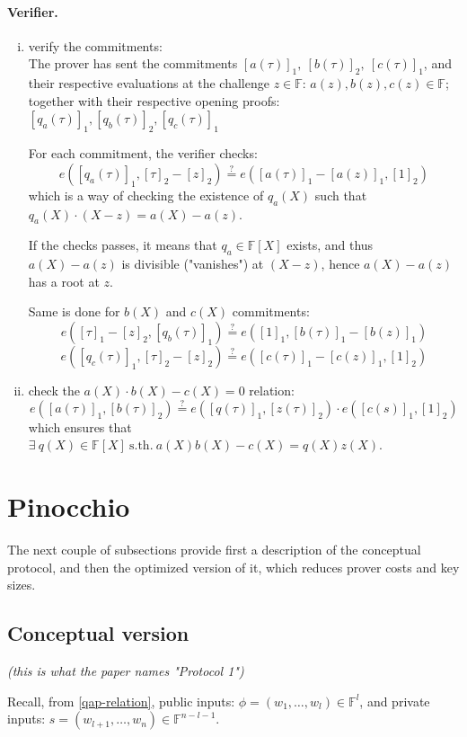 \documentclass{article}
\begin{document}
\paragraph{Verifier.}
\begin{enumerate}[i.]
    \item verify the commitments:\\
	The prover has sent the commitments $[a(\tau)]_1,~ [b(\tau)]_2,~ [c(\tau)]_1$, and their respective evaluations at the challenge $z \in \mathbb{F}$: $a(z), b(z), c(z) \in \mathbb{F}$; together with their respective opening proofs: $[q_a(\tau)]_1, [q_b(\tau)]_2, [q_c(\tau)]_1$

	For each commitment, the verifier checks:
	$$e([q_a(\tau)]_1, [\tau]_2 - [z]_2) \stackrel{?}{=} e([a(\tau)]_1 - [a(z)]_1, [1]_2)$$
	which is a way of checking the existence of $q_a(X)$ such that $q_a(X) \cdot (X-z) = a(X) - a(z)$.

	If the checks passes, it means that $q_a \in \mathbb{F}[X]$ exists, and thus $a(X) - a(z)$ is divisible ("vanishes") at $(X-z)$, hence $a(X) - a(z)$ has a root at $z$.

	Same is done for $b(X)$ and $c(X)$ commitments:
	$$e([\tau]_1 - [z]_2, [q_b(\tau)]_1) \stackrel{?}{=} e([1]_1, [b(\tau)]_1 - [b(z)]_1)$$
	$$e([q_c(\tau)]_1, [\tau]_2 - [z]_2) \stackrel{?}{=} e([c(\tau)]_1 - [c(z)]_1, [1]_2)$$

    \item check the $a(X) \cdot b(X) - c(X) = 0$ relation:
	$$e([a(\tau)]_1, [b(\tau)]_2) \stackrel{?}{=} e([q(\tau)]_1, [z(\tau)]_2) \cdot e([c(s)]_1, [1]_2)$$
	which ensures that $\exists~ q(X) \in \mathbb{F}[X] ~\text{s.th.}~ a(X) b(X) - c(X) = q(X) z(X)$.
\end{enumerate}

\section{Pinocchio}

The next couple of subsections provide first a description of the conceptual protocol, and then the optimized version of it, which reduces prover costs and key sizes.

\subsection{Conceptual version}
\emph{(this is what the paper names "Protocol 1")}

Recall, from \ref{qap-relation}, 
public inputs: $\phi = (w_1, \ldots, w_l) \in \mathbb{F}^l$, and private inputs: $s = (w_{l+1}, \ldots, w_n) \in \mathbb{F}^{n-l-1}$.
\end{document}
